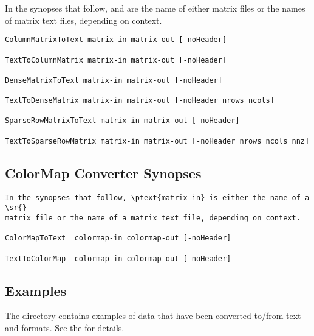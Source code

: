 In the synopses that follow,  and 
are the name of either \sr{} matrix files or the names of matrix text
files, depending on context.

\begin{verbatim}
ColumnMatrixToText matrix-in matrix-out [-noHeader]

TextToColumnMatrix matrix-in matrix-out [-noHeader]

DenseMatrixToText matrix-in matrix-out [-noHeader]

TextToDenseMatrix matrix-in matrix-out [-noHeader nrows ncols]

SparseRowMatrixToText matrix-in matrix-out [-noHeader]

TextToSparseRowMatrix matrix-in matrix-out [-noHeader nrows ncols nnz]
\end{verbatim}

\subsection{ColorMap Converter Synopses}

\begin{verbatim}
In the synopses that follow, \ptext{matrix-in} is either the name of a \sr{}
matrix file or the name of a matrix text file, depending on context.

ColorMapToText  colormap-in colormap-out [-noHeader]

TextToColorMap  colormap-in colormap-out [-noHeader]
\end{verbatim}

\subsection{Examples}
\label{sec:converter_ex}

The directory  
contains examples of data that have been converted to/from text and
\sr{} formats.  See the 
for details.

